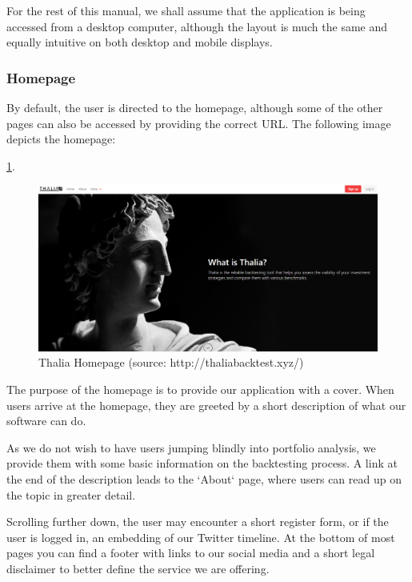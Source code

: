 \documentclass[main.tex]{subfiles}
\begin{document}
For the rest of this manual, we shall assume that the application is being accessed from a desktop computer, although the layout is much the same and equally intuitive on both desktop and mobile displays.

\subsubsection{Homepage}
By default, the user is directed to the homepage, although some of the other pages can also be accessed by providing the correct URL. The following image depicts the homepage:

\figurename{\ref{thalia_home}}.
\begin{figure}[H]
   \centering
   \includegraphics[width=\textwidth]{08Appendices/081User/081Pictures/homepage.png}
   \caption{Thalia Homepage (source: http://thaliabacktest.xyz/)}
   \label{thalia_home}
\end{figure}

The purpose of the homepage is to provide our application with a cover. When users arrive at the homepage, they are greeted by a short description of what our software can do.

As we do not wish to have users jumping blindly into portfolio analysis, we provide them with some basic information on the backtesting process. A link at the end of the description leads to the `About` page, where users can read up on the topic in greater detail.

Scrolling further down, the user may encounter a short register form, or if the user is logged in, an embedding of our Twitter timeline. At the bottom of most pages you can find a footer with links to our social media and a short legal disclaimer to better define the service we are offering.
\end{document}
